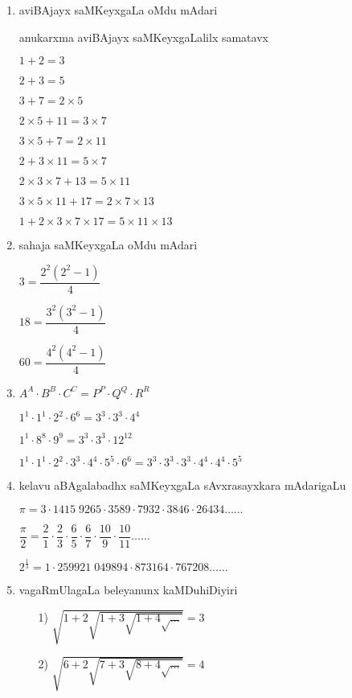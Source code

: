 \begin{enumerate}[{\rm I}]
\item aviBAjayx saMKeyxgaLa oMdu mAdari

anukarxma aviBAjayx saMKeyxgaLalilx samatavx

$1+2=3$

$2+3=5$

$3+7= 2 \times 5$

$2 \times 5+11=3 \times 7$

$3 \times 5+7= 2 \times 11$

$2+3 \times 11= 5 \times 7$

$2 \times 3 \times 7 + 13= 5 \times 11$

$3 \times 5 \times 11 + 17= 2 \times 7 \times 13$

$1+2 \times 3 \times 7 \times 17 = 5 \times 11 \times 13$

\item sahaja saMKeyxgaLa oMdu mAdari

$3= \dfrac{2^{2}(2^{2}-1)}{4}$

$18= \dfrac{3^{2}(3^{2}-1)}{4}$

$60= \dfrac{4^{2}(4^{2}-1)}{4}$

\item 

$A^{A}\cdot B^{B}\cdot C^{C}=P^{P}\cdot Q^{Q}\cdot R^{R}$

$1^{1}\cdot 1^{1}\cdot 2^{2}\cdot 6^{6}=3^{3}\cdot 3^{3}\cdot 4^{4}$

$1^{1}\cdot 8^{8}\cdot 9^{9}=3^{3}\cdot 3^{3}\cdot 12^{12}$

$1^{1}\cdot 1^{1}\cdot 2^{2}\cdot 3^{3}\cdot 4^{4}\cdot 5^{5}\cdot 6^{6} = 3^{3}\cdot 3^{3}\cdot 3^{3}\cdot 4^{4}\cdot 4^{4}\cdot 5^{5}$

\newpage

\item kelavu aBAgalabadhx saMKeyxgaLa sAvxrasayxkara mAdarigaLu

$\pi = 3\cdot 1415 \; 9265\cdot 3589\cdot 7932\cdot 3846\cdot 26434 \ldots\ldots$

$\dfrac{\pi}{2}= \dfrac{2}{1} \cdot \dfrac{2}{3}  \cdot \dfrac{6}{5}\cdot \dfrac{6}{7}\cdot \dfrac{10}{9}\cdot \dfrac{10}{11}\ldots\ldots $

$2^{\frac{1}{3}}= 1\cdot 259921 \; 049894\cdot 873164\cdot 767208\ldots\ldots$

\item vagaRmUlagaLa beleyanunx kaMDuhiDiyiri
\begin{itemize}
\item[{\rm 1)}] $\sqrt{1+2\sqrt{1+3\sqrt{1+4\sqrt{\ldots}}}} =3$
\item[{\rm 2)}] $\sqrt{6+2\sqrt{7+3\sqrt{8+4\sqrt{\ldots}}}} =4$
\end{itemize}


\end{enumerate}
